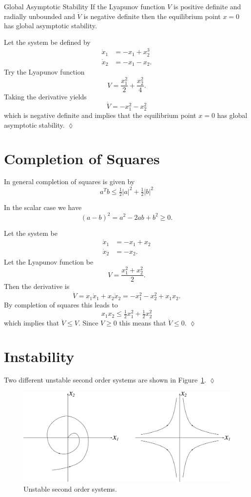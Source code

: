 \begin{theorem}{Global Asymptotic Stability}
If the Lyapunov function $V$ is positive definite and radially unbounded and $\dot{V}$ is negative definite then the equilibrium point $x=0$ has global asymptotic stability.
\end{theorem}

\begin{example}
Let the system be defined by
\begin{align*}
\dot{x}_1 &= -x_1 + x_2^3 \\
\dot{x}_2 &= -x_1 - x_2.
\end{align*}
Try the Lyapunov function
$$V = \frac{x_1^2}{2} + \frac{x_2^2}{4}.$$
Taking the derivative yields
$$\dot{V} = -x_1^2 - x_2^2$$
which is negative definite and implies that the equilibrium point $x=0$ has global asymptotic stability.
$\lozenge$
\end{example}

\section{Completion of Squares}
In general completion of squares is given by
$$a^T b \leq \tfrac{1}{2}|a|^2 + \tfrac{1}{2}|b|^2$$

In the scalar case we have
$${(a-b)}^2 = a^2 - 2ab + b^2 \geq 0.$$

\begin{example}
Let the system be
\begin{align*}
\dot{x}_1 &= -x_1 + x_2 \\
\dot{x}_2 &= -x_2.
\end{align*}
Let the Lyapunov function be
$$V = \frac{x_1^2+x_2^2}{2}.$$
Then the derivative is
$$\dot{V} = x_1\dot{x}_1 + x_2\dot{x}_2 = -x_1^2 - x_2^2 + x_1x_2.$$
By completion of squares this leads to
$$x_1x_2 \leq \tfrac{1}{2}x_1^2 + \tfrac{1}{2}x_2^2$$
which implies that $\dot{V} \leq V$.
Since $V \geq 0$ this means that $\dot{V} \leq 0$.
$\lozenge$
\end{example}

\section{Instability}
\begin{example}
Two different unstable second order systems are shown in Figure~\ref{fig:10instability}.
$\lozenge$
\end{example}

\begin{figure}[ht!]
\centering
\includegraphics[width=.4\textwidth]{images/10instability}
\caption{Unstable second order systems.}
\label{fig:10instability}
\end{figure}

